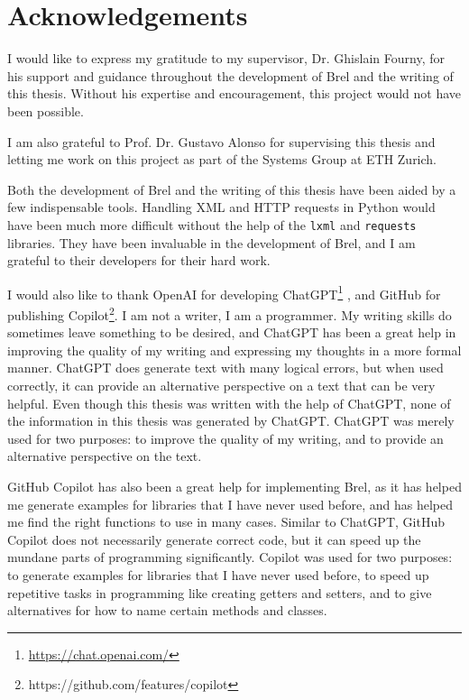 \section{Acknowledgements}

I would like to express my gratitude to my supervisor, Dr. Ghislain Fourny, 
for his support and guidance throughout the development of Brel and the writing of this thesis.
Without his expertise and encouragement, this project would not have been possible.

I am also grateful to Prof. Dr. Gustavo Alonso for supervising this thesis and letting me work on this project
as part of the Systems Group at ETH Zurich.

Both the development of Brel and the writing of this thesis have been aided by a few indispensable tools.
Handling XML and HTTP requests in Python would have been much more difficult without the help of the \texttt{lxml} and \texttt{requests} libraries.
They have been invaluable in the development of Brel, and I am grateful to their developers for their hard work.

I would also like to thank OpenAI for developing ChatGPT\footnote{\url{https://chat.openai.com/}} 
, and GitHub for publishing Copilot\footnote{https://github.com/features/copilot}.
I am not a writer, I am a programmer.
My writing skills do sometimes leave something to be desired, and ChatGPT has been a great help in improving the quality of my writing and expressing my thoughts in a more formal manner.
ChatGPT does generate text with many logical errors, but when used correctly, it can provide an alternative perspective on a text that can be very helpful. 
Even though this thesis was written with the help of ChatGPT, 
none of the information in this thesis was generated by ChatGPT.
ChatGPT was merely used for two purposes: to improve the quality of my writing, and to provide an alternative perspective on the text.

GitHub Copilot has also been a great help for implementing Brel, 
as it has helped me generate examples for libraries that I have never used before,
and has helped me find the right functions to use in many cases.
Similar to ChatGPT, GitHub Copilot does not necessarily generate correct code, 
but it can speed up the mundane parts of programming significantly.
Copilot was used for two purposes: to generate examples for libraries that I have never used before, 
to speed up repetitive tasks in programming like creating getters and setters, 
and to give alternatives for how to name certain methods and classes.

